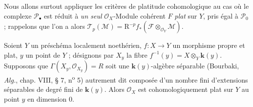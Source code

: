 Nous allons surtout appliquer les critères de platitude cohomologique au cas où
le complexe $\mathscr P_\bullet$ est réduit à \emph{un seul}
$\mathscr O_X$-Module cohérent $F$ \emph{plat} sur $Y$, pris égal à
$\mathscr P_0$ ; rappelons que l'on a alors
$\mathscr T_p(\mathscr M)=\mathrm R^{-p}f_*
(\mathscr F\otimes_{\mathscr O_Y}\mathscr M)$.

\begin{proposition}[7.8.6]
Soient $Y$ un préschéma localement noethérien, $f:X\to Y$ un morphisme propre
et plat, $y$ un point de $Y$ ; désignons par $X_y$ la fibre
$f^{-1}(y)=X\otimes_Y\boldsymbol{k}(y)$. Supposons que
$\Gamma(X_y,\mathscr O_{X_y})=R$ soit une $\boldsymbol{k}(y)$-algèbre séparable
\textup{(Bourbaki, \emph{Alg.}, chap. VIII, § 7, n\textsuperscript{o} 5)} autrement dit
composée d'un nombre fini d'extensions séparables de degré fini de $\boldsymbol{k}(y)$.
Alors $\mathscr O_X$ est cohomologiquement plat sur $Y$ au point $y$ en
dimension 0.
\end{proposition}


